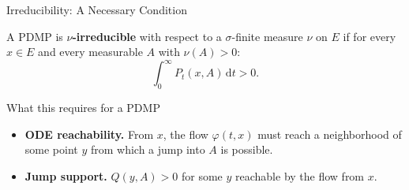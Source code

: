 \documentclass[aspectratio=169]{beamer}
\begin{document}
\begin{frame}{Irreducibility: A Necessary Condition}

  \begin{definition}
    A PDMP is \textbf{$\nu$-irreducible} with respect to a
    $\sigma$-finite measure $\nu$ on $E$ if for every $x \in E$
    and every measurable $A$ with $\nu(A) > 0$:
    \[
      \int_0^\infty P_t(x, A)\,\mathrm{d}t > 0.
    \]
  \end{definition}

  \bigskip
  \begin{block}{What this requires for a PDMP}
    \begin{itemize}
      \setlength\itemsep{6pt}
      \item \textbf{ODE reachability.} From $x$, the flow $\varphi(t,x)$
            must reach a neighborhood of some point $y$ from which a
            jump into $A$ is possible.
      \item \textbf{Jump support.} $Q(y, A) > 0$ for some $y$
            reachable by the flow from $x$.
    \end{itemize}
  \end{block}

\end{frame}
\end{document}
